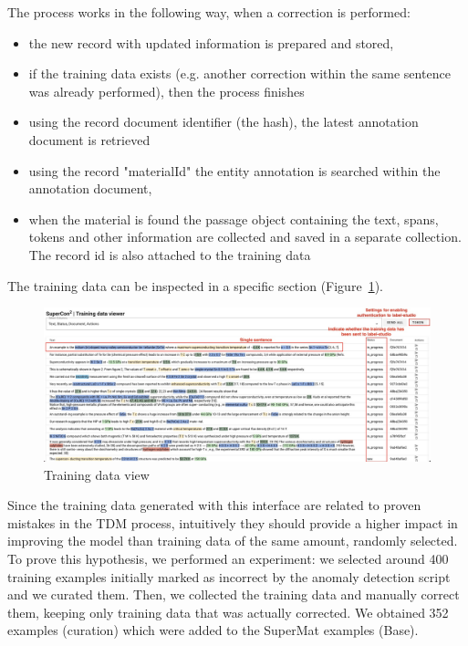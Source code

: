 \documentclass{article}
\begin{document}
The process works in the following way, when a correction is performed:
\begin{itemize}
    \item the new record with updated information is prepared and stored, 
    \item if the training data exists (e.g. another correction within the same sentence was already performed), then the process finishes
    \item using the record document identifier (the hash), the latest annotation document is retrieved
    \item using the record "materialId" the entity annotation is searched within the annotation document,
    \item when the material is found the passage object containing the text, spans, tokens and other information are collected and saved in a separate collection. The record id is also attached to the training data 
\end{itemize}

The training data can be inspected in a specific section (Figure~\ref{fig:training-data-view}).

\begin{figure}[t]
  \centering
  \includegraphics[width=1\textwidth]{images/training-data-viewer} 
  \caption{Training data view}
  \label{fig:training-data-view}
\end{figure}

Since the training data generated with this interface are related to proven mistakes in the TDM process, intuitively they should provide a higher impact in improving the model than training data of the same amount, randomly selected.
To prove this hypothesis, we performed an experiment: we selected around 400 training examples initially marked as incorrect by the anomaly detection script and we curated them. 
Then, we collected the training data and manually correct them, keeping only training data that was actually corrected. 
We obtained 352 examples (curation) which were added to the SuperMat examples (Base). 
\end{document}
